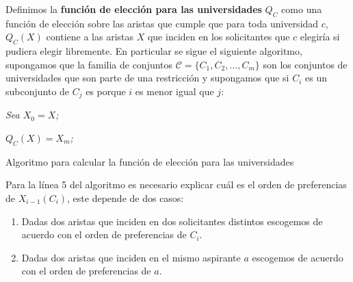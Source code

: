 \begin{dfn}
Definimos la \textbf{función de elección para las universidades} $Q_C$ como una función de elección sobre las aristas que cumple que para toda universidad $c$, $Q_C(X)$ contiene a las aristas $X$ que inciden en los solicitantes que $c$ elegiría si pudiera elegir libremente. En particular se sigue el siguiente algoritmo, supongamos que la familia de conjuntos $\mathcal{C}=\{C_1,C_2,\dots,C_m\}$ son los conjuntos de universidades que son parte de una restricción y supongamos que si $C_i$ es un subconjunto de $C_j$ es porque $i$ es menor igual que $j$:

\IncMargin{1em}
\begin{Algoritmo}[H]

\BlankLine
\emph{Sea $X_0 = X$;}


\emph{$Q_C(X) = X_m$;}
\caption{Algoritmo para calcular la función de elección para las universidades}
\end{Algoritmo}
\DecMargin{1em}

Para la línea 5 del algoritmo es necesario explicar cuál es el orden de preferencias de $X_{i-1}(C_i)$, este depende de dos casos: 
\begin{enumerate}
\item Dadas dos aristas que inciden en dos solicitantes distintos escogemos de acuerdo con el orden de preferencias de $C_i$.
\item Dadas dos aristas que inciden en el mismo aspirante $a$ escogemos de acuerdo con el orden de preferencias de $a$.
\end{enumerate}

\end{dfn}

